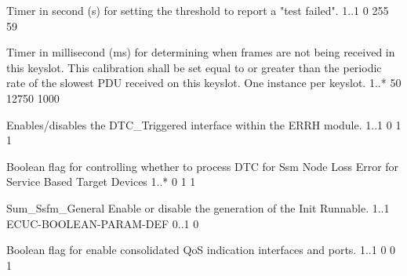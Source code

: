 {}

{Timer in second (s) for setting the threshold to report a "test failed".}
{1..1}
{0}
{255}
{59}

{Timer in millisecond (ms) for determining when frames are not being received in this keyslot. This calibration shall be set equal
to or greater than the periodic rate of the slowest PDU received on this keyslot. One instance per keyslot.}
{1..*}
{50}
{12750}
{1000}
{       }


{Enables/disables the DTC_Triggered interface within the ERRH module.}
{1..1}
{0}
{1}
{1}
{  }

{Boolean flag for controlling whether to process DTC for Ssm Node Loss Error for Service Based Target Devices}
{1..*}
{0}
{1}
{1}

{} 


{Sum_Ssfm_General}
{Enable or disable the generation of the Init Runnable.}
{1..1}
{ECUC-BOOLEAN-PARAM-DEF}
{0..1}
{0}
{  }


{Boolean flag for enable consolidated QoS indication interfaces and ports.  }
{1..1}
{0}
{0}
{1}
{  }